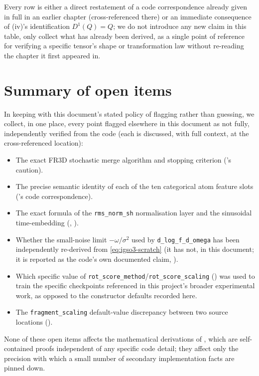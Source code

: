 \documentclass[11pt,a4paper]{report}
\theoremstyle{definition}
\theoremstyle{remark}
\newcommand{\pyfunc}[1]{\texttt{#1}}
\begin{document}
Every row is either a direct restatement of a code correspondence already
given in full in an earlier chapter (cross-referenced there) or an
immediate consequence of (iv)'s identification
$D^1(Q)=Q$; we do not introduce any new claim in this table, only collect
what has already been derived, as a single point of reference for
verifying a specific tensor's shape or transformation law without
re-reading the chapter it first appeared in.

\section{Summary of open items}
\label{sec:open-items-summary}

In keeping with this document's stated policy of flagging rather than
guessing, we collect, in one place, every point flagged elsewhere in this
document as not fully, independently verified from the code (each is
discussed, with full context, at the cross-referenced location):
\begin{itemize}
\item The exact FR3D stochastic merge algorithm and stopping criterion
('s caution).
\item The precise semantic identity of each of the ten categorical atom
feature slots ('s code correspondence).
\item The exact formula of the \texttt{rms\_norm\_sh} normalisation layer
and the sinusoidal time-embedding (,
).
\item Whether the small-noise limit $-\omega/\sigma^2$ used by
\pyfunc{d\_log\_f\_d\_omega} has been independently re-derived from
\eqref{eq:igso3-scratch} (it has not, in this document; it is reported as
the code's own documented claim, ).
\item Which specific value of \texttt{rot\_score\_method}/\texttt{rot\_score\_scaling}
() was used to train the specific checkpoints
referenced in this project's broader experimental work, as opposed to the
constructor defaults recorded here.
\item The \texttt{fragment\_scaling} default-value discrepancy between two
source locations ().
\end{itemize}
None of these open items affects the mathematical derivations of
,
which are self-contained proofs independent of any specific code detail;
they affect only the precision with which a small number of secondary
implementation facts are pinned down.
\end{document}
